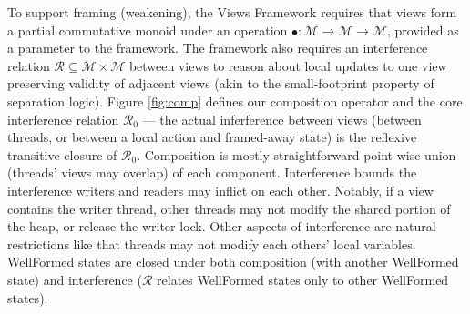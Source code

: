  To support framing (weakening), the Views Framework requires that views form a partial commutative monoid under an operation $\bullet : \mathcal{M} \longrightarrow \mathcal{M} \longrightarrow \mathcal{M}$, provided as a parameter to the framework.
The framework also requires an interference relation $\mathcal{R}\subseteq\mathcal{M}\times\mathcal{M}$ between views to reason about local updates to one view preserving validity of adjacent views (akin to the small-footprint property of separation logic).
Figure \ref{fig:comp} defines our composition operator and the core interference relation $\mathcal{R}_0$ --- the actual inferference between views (between threads, or between a local action and framed-away state) is the reflexive transitive closure of $\mathcal{R}_0$.
Composition is mostly straightforward point-wise union (threads' views may overlap) of each component.
Interference bounds the interference writers and readers may inflict on each other.  Notably, if a view contains the writer thread, other threads may not modify the shared portion of the heap, or release the writer lock.  Other aspects of interference are natural restrictions like that threads may not modify each others' local variables.
\textsf{WellFormed} states are closed under both composition (with another \textsf{WellFormed} state) and interference ($\mathcal{R}$ relates \textsf{WellFormed} states only to other \textsf{WellFormed} states).

